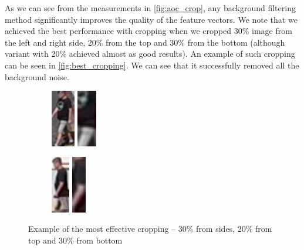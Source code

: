 As we can see from the measurements in \autoref{fig:aoc_crop}, any background filtering method significantly improves the quality of the feature vectors. We note that we achieved the best performance with cropping when we 
cropped 30\% image from the left and right side, 20\% from the top and 30\%
from the bottom (although variant with 20\% achieved almost as good results). An example of such cropping can be seen in
\autoref{fig:best_cropping}. We can see that it successfully removed all the background noise.

\begin{figure}
    \centering
     \begin{subfigure}[b]{0.49\textwidth}
         \centering
         \includegraphics[height=2.5cm]{img/0.png}
         \includegraphics[height=2.5cm]{img/0_crop.png}
     \end{subfigure}
     \hfill
      \begin{subfigure}[b]{0.49\textwidth}
         \centering
         \includegraphics[height=2.5cm]{img/1.png}
         \includegraphics[height=2.5cm]{img/1_crop.png}
     \end{subfigure}
    \caption{Example of the most effective cropping -- 30\% from sides, 20\% from top and 30\% from bottom}
    \label{fig:best_cropping}
\end{figure}

